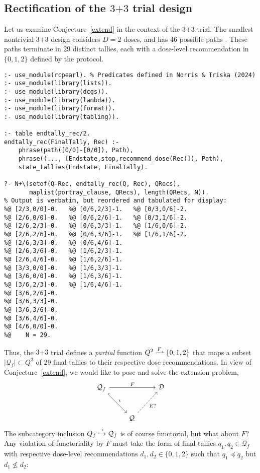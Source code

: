 \documentclass{article}
\newcommand{\D}{\ensuremath{\mathcal{D}}}
\newcommand{\Q}{\ensuremath{\mathcal{Q}}}
\begin{document}
\subsection{Rectification of the $\mbox{3+3}$ trial design}

Let us examine Conjecture~\ref{extend} in the context of the $\mbox{3+3}$ trial.  The smallest nontrivial $\mbox{3+3}$ design considers $D = 2$ doses, and has 46 possible paths \cite{norris_executable_2024}.  These paths terminate in 29 distinct tallies, each with a dose-level recommendation in $\{0, 1, 2\}$ defined by the protocol.

\begin{verbatim}
:- use_module(rcpearl). % Predicates defined in Norris & Triska (2024)
:- use_module(library(lists)).
:- use_module(library(dcgs)).
:- use_module(library(lambda)).
:- use_module(library(format)).
:- use_module(library(tabling)).

:- table endtally_rec/2.
endtally_rec(FinalTally, Rec) :-
    phrase(path([0/0]-[0/0]), Path),
    phrase((..., [Endstate,stop,recommend_dose(Rec)]), Path),
    state_tallies(Endstate, FinalTally).

?- N+\(setof(Q-Rec, endtally_rec(Q, Rec), QRecs),
       maplist(portray_clause, QRecs), length(QRecs, N)).
% Output is verbatim, but reordered and tabulated for display:
%@ [2/3,0/0]-0.   %@ [0/6,2/3]-1.   %@ [0/3,0/6]-2.
%@ [2/6,0/0]-0.   %@ [0/6,2/6]-1.   %@ [0/3,1/6]-2.
%@ [2/6,2/3]-0.   %@ [0/6,3/3]-1.   %@ [1/6,0/6]-2.
%@ [2/6,2/6]-0.   %@ [0/6,3/6]-1.   %@ [1/6,1/6]-2.
%@ [2/6,3/3]-0.   %@ [0/6,4/6]-1.
%@ [2/6,3/6]-0.   %@ [1/6,2/3]-1.
%@ [2/6,4/6]-0.   %@ [1/6,2/6]-1.
%@ [3/3,0/0]-0.   %@ [1/6,3/3]-1.
%@ [3/6,0/0]-0.   %@ [1/6,3/6]-1.
%@ [3/6,2/3]-0.   %@ [1/6,4/6]-1.
%@ [3/6,2/6]-0.
%@ [3/6,3/3]-0.
%@ [3/6,3/6]-0.
%@ [3/6,4/6]-0.
%@ [4/6,0/0]-0.
%@    N = 29.
\end{verbatim}

       Thus, the $\mbox{3+3}$ trial defines a {\em partial} function $Q^2 \xrightharpoonup{F} \{0,1,2\}$ that maps a subset $|\Q_f| \subset Q^2$ of 29 final tallies to their respective dose recommendations.  In view of Conjecture~\ref{extend}, we would like to pose and solve the extension problem,
\begin{equation}\label{extension-problem}
  \begin{tikzcd}[row sep=large]
    \Q_f \ar[dr,hook,"\iota"] \ar[rr,"F"] & & \D \\
    & \Q\, \ar[ur,dashed,"E?"']
  \end{tikzcd}
\end{equation}
The subcategory inclusion $Q_f \xhookrightarrow{\iota} \Q_f$ is of course functorial, but what about $F$?  Any violation of functoriality by $F$ must take the form of final tallies $q_1, q_2 \in \Q_f$ with respective dose-level recommendations $d_1, d_2 \in \{0,1,2\}$ such that $q_1 \preceq q_2$ but $d_1 \not\le d_2$:
\end{document}
